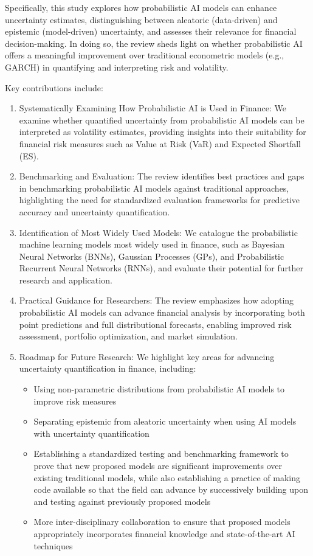 Specifically, this study explores how probabilistic AI models can enhance uncertainty estimates, distinguishing between aleatoric (data-driven) and epistemic (model-driven) uncertainty, and assesses their relevance for financial decision-making. In doing so, the review sheds light on whether probabilistic AI offers a meaningful improvement over traditional econometric models (e.g., GARCH) in quantifying and interpreting risk and volatility.

Key contributions include:

\begin{enumerate}
    \item Systematically Examining How Probabilistic AI is Used in Finance: We examine whether quantified uncertainty from probabilistic AI models can be interpreted as volatility estimates, providing insights into their suitability for financial risk measures such as Value at Risk (VaR) and Expected Shortfall (ES).
    \item Benchmarking and Evaluation: The review identifies best practices and gaps in benchmarking probabilistic AI models against traditional approaches, highlighting the need for standardized evaluation frameworks for predictive accuracy and uncertainty quantification.
    \item Identification of Most Widely Used Models: We catalogue the probabilistic machine learning models most widely used in finance, such as Bayesian Neural Networks (BNNs), Gaussian Processes (GPs), and Probabilistic Recurrent Neural Networks (RNNs), and evaluate their potential for further research and application.
    \item Practical Guidance for Researchers: The review emphasizes how adopting probabilistic AI models can advance financial analysis by incorporating both point predictions and full distributional forecasts, enabling improved risk assessment, portfolio optimization, and market simulation.
    \item Roadmap for Future Research: We highlight key areas for advancing uncertainty
quantification in finance, including:
        \begin{itemize}
            \item Using non-parametric distributions from probabilistic AI models to improve risk measures
            \item Separating epistemic from aleatoric uncertainty when using AI models with uncertainty quantification
            \item Establishing a standardized testing and benchmarking framework to prove that new proposed models are significant improvements over existing traditional models, while also establishing a practice of making code available so that the field can advance by successively building upon and testing against previously proposed models
            \item More inter-disciplinary collaboration to ensure that proposed models appropriately incorporates financial knowledge and state-of-the-art AI techniques
        \end{itemize}
\end{enumerate}

